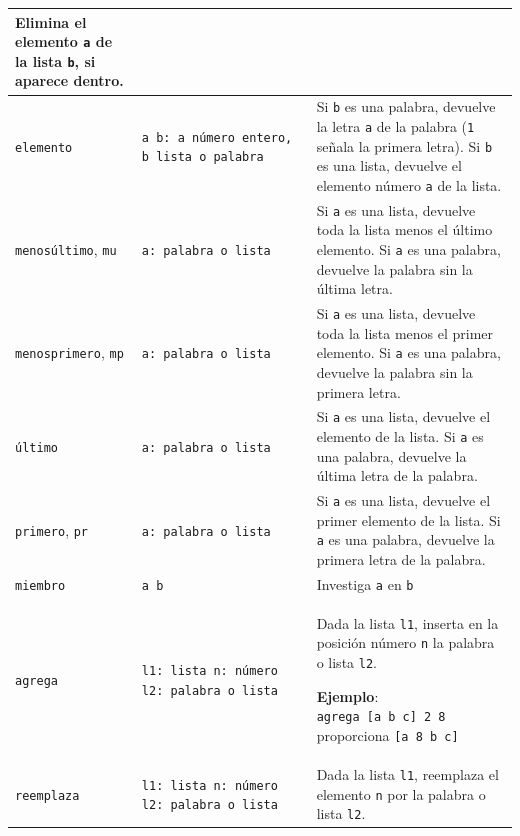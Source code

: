 \begin{center}
\begin{longtable}{|m{3cm}|m{4cm}|m{9cm}|}
        Elimina el elemento \texttt{a} de la lista \texttt{b}, si aparece
        dentro. \\ \hline 
   \texttt{elemento} \index{elemento@\texttt{elemento}} & 
      \texttt{\mbox{a b: a n\'umero entero,} b~lista~o~palabra} &
        Si \texttt{b} es una palabra, devuelve la letra \texttt{a} de la
        palabra (\texttt{1} se\~nala la primera letra). Si \texttt{b} es
        una lista, devuelve el elemento n\'umero \texttt{a} de la lista.
                        \\ \hline 
   \texttt{menos\'ultimo}, \index{menos\'ultimo@\texttt{menos\'ultimo}}
      \texttt{mu} \index{mu@\texttt{mu}} & \texttt{a: palabra o lista} &
        Si \texttt{a} es una lista, devuelve toda la lista menos el \'ultimo
        elemento. Si \texttt{a} es una palabra, devuelve la palabra sin la
        \'ultima letra. \\ \hline 
   \texttt{menosprimero}, \index{menosprimero@\texttt{menosprimero}}
     \texttt{mp} \index{mp@\texttt{mp}} & \texttt{a: palabra o lista} &
       Si \texttt{a} es una lista, devuelve toda la lista menos el primer
       elemento. Si \texttt{a} es una palabra, devuelve la palabra sin la
       primera letra.\\ \hline 
   \texttt{\'ultimo} \index{ultimo@\texttt{\'ultimo}} & 
     \texttt{a: palabra o lista}&
        Si \texttt{a} es una lista, devuelve el elemento de la lista. Si
        \texttt{a} es una palabra, devuelve la \'ultima letra de la palabra.
                        \\ \hline 
   \texttt{primero}, \index{primero@\texttt{primero}}
     \texttt{pr} \index{pr@\texttt{pr}} & \texttt{a: palabra o lista} &
        Si \texttt{a} es una lista, devuelve el primer elemento de la lista.
        Si \texttt{a} es una palabra, devuelve la primera letra de la palabra.
                        \\ \hline 
   \texttt{miembro} \index{miembro@\texttt{miembro}} & \texttt{a b} &
        Investiga \texttt{a} en \texttt{b} \\ \hline 
   \texttt{agrega} \index{agrega@\texttt{agrega}} &
      \texttt{l1:~lista  n:~{}n\'umero l2:~palabra~o~lista} &
        Dada la lista \texttt{l1}, inserta en la posici\'on n\'umero \texttt{n}
        la palabra o lista \texttt{l2}.

        \textbf{Ejemplo}: \texttt{agrega~[a~b~c]~2~8} proporciona
        \texttt{[a~8~b~c]} \\ \hline 
   \texttt{reemplaza} \index{reemplaza@\texttt{reemplaza}} &
     \texttt{l1:~lista n:~{}n\'umero l2:~palabra~o~lista} &
        Dada la lista \texttt{l1}, reemplaza el elemento \texttt{n} por la
        palabra o lista \texttt{l2}.


\end{longtable}
\end{center}
